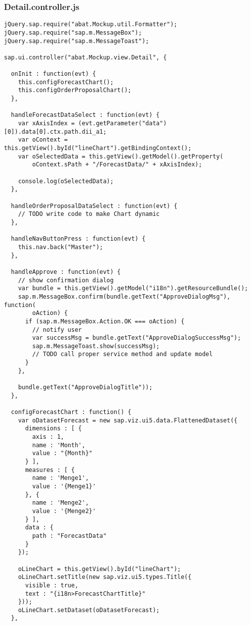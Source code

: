 \subsubsection*{Detail.controller.js}
\begin{lstlisting}[frame=htrbl, label=lst:Detail.controller.js]
jQuery.sap.require("abat.Mockup.util.Formatter");
jQuery.sap.require("sap.m.MessageBox");
jQuery.sap.require("sap.m.MessageToast");

sap.ui.controller("abat.Mockup.view.Detail", {

  onInit : function(evt) {
    this.configForecastChart();
    this.configOrderProposalChart();
  },

  handleForecastDataSelect : function(evt) {
    var xAxisIndex = (evt.getParameter("data")[0]).data[0].ctx.path.dii_a1;
    var oContext = this.getView().byId("lineChart").getBindingContext();
    var oSelectedData = this.getView().getModel().getProperty(
        oContext.sPath + "/ForecastData/" + xAxisIndex);

    console.log(oSelectedData);
  },

  handleOrderProposalDataSelect : function(evt) {
    // TODO write code to make Chart dynamic
  },

  handleNavButtonPress : function(evt) {
    this.nav.back("Master");
  },

  handleApprove : function(evt) {
    // show confirmation dialog
    var bundle = this.getView().getModel("i18n").getResourceBundle();
    sap.m.MessageBox.confirm(bundle.getText("ApproveDialogMsg"), function(
        oAction) {
      if (sap.m.MessageBox.Action.OK === oAction) {
        // notify user
        var successMsg = bundle.getText("ApproveDialogSuccessMsg");
        sap.m.MessageToast.show(successMsg);
        // TODO call proper service method and update model
      }
    },

    bundle.getText("ApproveDialogTitle"));
  },

  configForecastChart : function() {
    var oDatasetForecast = new sap.viz.ui5.data.FlattenedDataset({
      dimensions : [ {
        axis : 1,
        name : 'Month',
        value : "{Month}"
      } ],
      measures : [ {
        name : 'Menge1',
        value : '{Menge1}'
      }, {
        name : 'Menge2',
        value : '{Menge2}'
      } ],
      data : {
        path : "ForecastData"
      }
    });

    oLineChart = this.getView().byId("lineChart");
    oLineChart.setTitle(new sap.viz.ui5.types.Title({
      visible : true,
      text : "{i18n>ForecastChartTitle}"
    }));
    oLineChart.setDataset(oDatasetForecast);
  },


\end{lstlisting}
